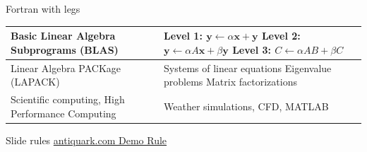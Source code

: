 \documentclass[aspectratio=169]{beamer}
\begin{document}
\begin{frame}{Fortran with legs}
    \begin{tabulary}{\textwidth}{|L|L|}
        \hline
        Basic Linear Algebra Subprograms (BLAS) &
        Level 1: \(\bm{y} \leftarrow \alpha \bm{x} + \bm{y}\) \newline
        Level 2: \(\bm{y} \leftarrow \alpha {A} \bm{x} + \beta \bm{y}\) \newline
        Level 3: \({C} \leftarrow \alpha {AB} + \beta {C}\) \\
        \hline

        Linear Algebra PACKage (LAPACK) &
        Systems of linear equations \newline
        Eigenvalue problems \newline
        Matrix factorizations \\
        \hline

        Scientific computing,
        High Performance Computing &
        Weather simulations, CFD, MATLAB \\
        \hline

    \end{tabulary}
\end{frame}

\begin{frame}{Slide rules}
    \href{http://www.antiquark.com/sliderule/sim/160es/virtual-160-es.html}{antiquark.com Demo Rule}
\end{frame}
\end{document}
